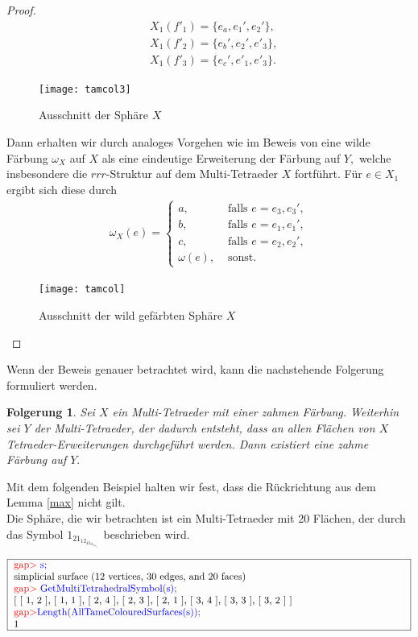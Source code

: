 \documentclass[12pt,titlepage,twoside,cleardoublepage]{article}
\theoremstyle{nummermitklammern}
\newtheorem{folgerung}[temp]{Folgerung}
\newtheorem{folgerung}[zahl]{Folgerung}
\numberwithin{equation}{section}
\begin{document}
\begin{proof}
\begin{align*}
&X_1(f'_1)=\{e_a,e_1',e_2'\},\\
&X_1(f'_2)=\{e_b',e_2',e'_3\},\\
&X_1(f'_3)=\{e_c',e'_1,e'_3\}.
\end{align*}
\begin{figure}[H]
\begin{center}
\texttt{[image: tamcol3]}
\end{center}
\caption{Ausschnitt der Sphäre $X$}
\end{figure}
Dann erhalten wir durch analoges Vorgehen wie im Beweis von  eine wilde Färbung $\omega_X$ auf $X$ als eine eindeutige Erweiterung der Färbung auf $Y,$ welche insbesondere die $rrr$-Struktur auf dem Multi-Tetraeder $X$ fortführt. Für $e\in X_1$ ergibt sich diese durch 
\begin{align*}
\omega_X(e)=
\begin{cases}
a,& \text{ falls } e=e_3,e_3',\\
b,& \text{ falls } e=e_1,e_1',\\
c,& \text{ falls }e=e_2,e_2',\\
\omega(e),& \text{ sonst}.
\end{cases}
\end{align*}

\begin{figure}[H]
\begin{center}
\texttt{[image: tamcol]}
\end{center}
\caption{Ausschnitt der wild gefärbten Sphäre $X$}
\end{figure}
\end{proof}
Wenn der Beweis genauer betrachtet wird, kann die nachstehende Folgerung formuliert werden.
\begin{folgerung}
Sei $X$ ein Multi-Tetraeder mit einer zahmen Färbung. Weiterhin sei $Y$ der Multi-Tetraeder, der dadurch entsteht, dass an allen Flächen von $X$ Tetraeder-Erweiterungen durchgeführt werden. Dann existiert eine zahme Färbung auf $Y.$
\end{folgerung}
Mit dem folgenden Beispiel halten wir fest, dass die Rückrichtung aus dem Lemma \ref{max} nicht gilt.\\
Die Sphäre, die wir betrachten ist ein Multi-Tetraeder mit 20 Flächen, der durch das Symbol $1_21_12_42_32_13_43_33_2$ beschrieben wird.
\begin{center}
$\fbox{
\parbox{14cm}{
\textcolor{red}{gap$>$} \textcolor{blue}{s;}\newline
simplicial surface (12 vertices, 30 edges, and 20 faces)\newline
\textcolor{red}{gap$>$} \textcolor{blue}{GetMultiTetrahedralSymbol(s);}\newline
[ [ 1, 2 ], [ 1, 1 ], [ 2, 4 ], [ 2, 3 ], [ 2, 1 ], [ 3, 4 ], [ 3, 3 ],
  [ 3, 2 ] ]\newline
\textcolor{red}{gap$>$}\textcolor{blue}{ Length(AllTameColouredSurfaces(s));}\newline
1
}}$
\end{center}
\end{document}
